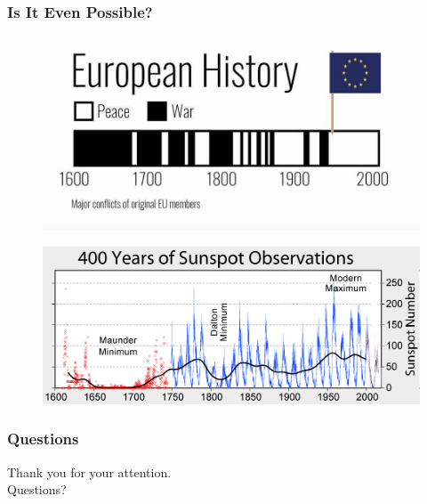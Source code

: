 \begin{frame}
	\frametitle{Is It Even Possible?}
    \vspace{3mm}
\begin{figure}[!b]
      \includegraphics[width=0.6\columnwidth]{fig/wars.jpg}
\end{figure}
\begin{figure}[!b]
    \hspace{5mm}
      \includegraphics[width=0.6\columnwidth]{fig/Sunspot_Numbers.png}
\end{figure}
\end{frame}


\begin{frame}
	\frametitle{Questions}
	\begin{center}
		\vfill
		Thank you for your attention.\\
		\vfill
		Questions?
		\vfill
	\end{center}
\end{frame}



